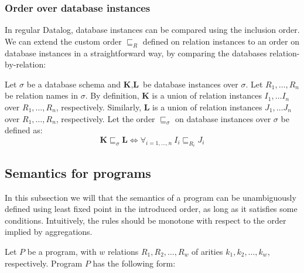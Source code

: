 \subsubsection{Order over database instances}

In regular Datalog, database instances can be compared using the inclusion order. We can extend the custom order $\sqsubseteq_R$ defined on relation instances to an order on database instances in a straightforward way, by comparing the databases relation-by-relation:

\begin{defn}
Let $\sigma$ be a database schema and $\textbf{K}, \textbf{L}$ be database instances over $\sigma$. Let $R_1, \dots, R_n$ be relation names in $\sigma$. By definition, $\textbf{K}$ is a union of relation instances $I_1, \dots I_n$ over $R_1, \dots, R_n$, respectively. Similarly, $\textbf{L}$ is a union of relation instances $J_1, \dots J_n$ over $R_1, \dots, R_n$, respectively.  Let the order $\sqsubseteq_\sigma$ on database instances over $\sigma$ be defined as:
$$\textbf{K} \sqsubseteq_\sigma \textbf{L} \iff \forall_{i=1, \dots, n}~I_i \sqsubseteq_{R_i} J_i$$
\end{defn}

\subsection{Semantics for \datalogra programs}\label{ss:semdra}
In this subsection we will that the semantics of a \datalogra program can be unambiguously defined using least fixed point in the introduced order, as long as it satisfies some conditions. Intuitively, the rules should be monotone with respect to the order implied by aggregations. 


Let $P$ be a \datalogra program, with $w$ \idb relations $R_1, R_2, \dots, R_w$ of arities $k_1, k_2, \dots, k_w$, respectively. Program $P$ has the following form:


